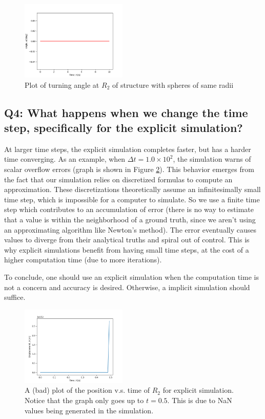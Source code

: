 \documentclass[letterpaper, 10 pt, conference]{ieeeconf}  %
\begin{document}
\begin{figure}[!ht]
        \centering
        \includegraphics[width=0.45\textwidth,keepaspectratio]{p1q3_implicit_fallingBeam_angle.png}
        \caption{Plot of turning angle at $R_2$ of structure with spheres of same radii}
        \label{"fig:p1q3_turning_angle"}
\end{figure}


\subsection*{ Q4: What happens when we change the time step, specifically for the explicit simulation?}
At larger time steps, the explicit simulation completes faster, but has a harder time converging. As an example, when $\Delta t = 1.0 \times  10^2$, the simulation warns of scalar overflow errors (graph is shown in Figure \ref{"fig:p1q4_bad_graph"}). This behavior emerges from the fact that our simulation relies on discretized formulas to compute an approximation. These discretizations theoretically assume an infinitesimally small time step, which is impossible for a computer to simulate. So we use a finite time step which contributes to an accumulation of error (there is no way to estimate that a value is within the neighborhood of a ground truth, since we aren't using an approximating algorithm like Newton's method). The error eventually causes values to diverge from their analytical truths and spiral out of control. This is why explicit simulations benefit from having small time steps, at the cost of a higher computation time (due to more iterations).

To conclude, one should use an explicit simulation when the computation time is not a concern and accuracy is desired. Otherwise, a implicit simulation should suffice. 

\begin{figure}[!ht]
        \centering
        \includegraphics[width=0.45\textwidth,keepaspectratio]{p1q4_explicit_fallingBeam.png}
        \caption{A (bad) plot of the position v.s. time of $R_2$ for explicit simulation. Notice that the graph only goes up to $t=0.5$. This is due to NaN values being generated in the simulation.}
        \label{"fig:p1q4_bad_graph"}
\end{figure}
\end{document}
